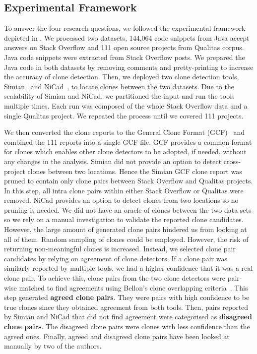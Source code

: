 \documentclass[sigconf,review, anonymous]{acmart}
\begin{document}
\subsection{Experimental Framework}
To answer the four research questions, we followed the experimental framework depicted in . We processed two datasets, 144,064 code snippets from Java accept answers on Stack Overflow and 111 open source projects from Qualitas corpus. Java code snippets were extracted from Stack Overflow posts. We prepared the Java code in both datasets by removing comments and pretty-printing to increase the accuracy of clone detection. Then, we deployed two clone detection tools, Simian~\cite{simian} and NiCad~\cite{Roy2008,Cordy}, to locate clones between the two datasets. Due to the scalability of Simian and NiCad, we partitioned the input and run the tools multiple times. Each run was composed of the whole Stack Overflow data and a single Qualitas project. We repeated the process until we covered 111 projects. 

We then converted the clone reports to the General Clone Format (GCF)~\cite{Wang2013} and combined the 111 reports into a single GCF file. GCF provides a common format for clones which enables other clone detectors to be adopted,
if needed, without any changes in the analysis. Simian did not provide an option to detect cross-project clones between two locations. Hence the Simian GCF clone report was pruned to contain only clone pairs between Stack Overflow and Qualitas projects. In this step, all intra clone pairs within either Stack Overflow or Qualitas were removed. NiCad provides an option to detect clones from two locations so no pruning is needed. We did not have an oracle of clones between the two data sets so we rely on a manual investigation to validate the reported clone candidates. However, the large amount of generated clone pairs hindered us from looking at all of them. Random sampling of clones could be employed. However, the risk of returning non-meaningful clones is increased. Instead, we selected clone pair candidates by relying on agreement of clone detectors. If a clone pair was similarly reported by multiple tools, we had a higher confidence that it was a real clone pair. To achieve this, clone pairs from the two clone detectors were pair-wise matched to find agreements using Bellon's clone overlapping criteria~\cite{Bellon2007}. This step generated \textbf{agreed clone pairs}. They were pairs with high confidence to be true clones since they obtained agreement from both tools. Then, pairs reported by Simian and NiCad that did not find agreement were categorised as \textbf{disagreed clone pairs}. The disagreed clone pairs were clones with less confidence than the agreed ones. Finally, agreed and disagreed clone pairs have been looked at manually by two of the authors.
\end{document}
